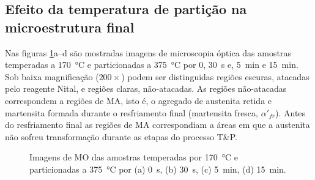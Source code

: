 \label{sec:micros}




\subsection{Efeito da temperatura de partição na microestrutura final}

\label{sec:micros_TP}

Nas figuras \ref{fig:TP375MO}a--d são mostradas imagens de microscopia óptica das amostras temperadas a \SI{170}{\degreeCelsius} e particionadas a \SI{375}{\degreeCelsius} por 0, 30~s e, 5~min e 15~min. 
Sob baixa magnificação ($200\times$) podem ser distinguidas regiões escuras, atacadas pelo reagente Nital, e regiões claras, não-atacadas. As regiões não-atacadas correspondem a regiões de MA, isto é, o agregado de austenita retida e martensita formada durante o resfriamento final (martensita fresca, $\alpha'_{fr}$). Antes do resfriamento final as regiões de MA correspondiam a áreas em que a austenita não sofreu transformação durante as etapas do processo T\&P.

\begin{figure}
  \centering
  \quad
  \vspace{0pt}
  \quad
  \caption{Imagens de MO das amostras temperadas por \SI{170}{\degreeCelsius} e particionadas a \SI{375}{\degreeCelsius} por (a) 0~s, (b) 30~s, (c) 5~min, (d) 15~min.}
  \label{fig:TP375MO}
\end{figure}

